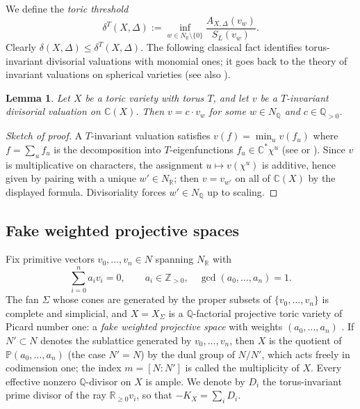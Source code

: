 \documentclass[11pt]{amsart}
\newtheorem{lemma}[theorem]{Lemma}
\theoremstyle{definition}
\theoremstyle{remark}
\newcommand{\NR}{N_{\mathbb{R}}}
\newcommand{\Q}{\mathbb{Q}}
\newcommand{\R}{\mathbb{R}}
\newcommand{\Z}{\mathbb{Z}}
\newcommand{\C}{\mathbb{C}}
\newcommand{\PP}{\mathbb{P}}
\begin{document}
We define the \emph{toric threshold}
\[
\delta^T(X,\Delta) := \inf_{w\in\NR\setminus\{0\}}
\frac{A_{X,\Delta}(v_w)}{S_L(v_w)} .
\]
Clearly \(\delta(X,\Delta)\le\delta^T(X,\Delta)\). The following classical
fact identifies torus-invariant divisorial valuations with monomial ones;
it goes back to the theory of invariant valuations on spherical varieties
\cite{Kno93} (see also \cite[\S7]{BJ20}).

\begin{lemma}\label{lem:invariant}
Let \(X\) be a toric variety with torus \(T\), and let \(v\) be a
\(T\)-invariant divisorial valuation on \(\C(X)\). Then \(v=c\cdot v_w\)
for some \(w\in N_{\Q}\) and \(c\in\Q_{>0}\).
\end{lemma}

\begin{proof}[Sketch of proof]
A \(T\)-invariant valuation satisfies
\(v(f)=\min_u v(f_u)\) where \(f=\sum_u f_u\) is the decomposition into
\(T\)-eigenfunctions \(f_u\in\C^*\chi^u\) (see \cite{Kno93} or
\cite[\S19-20]{Tim11}). Since \(v\) is multiplicative on characters, the
assignment \(u\mapsto v(\chi^u)\) is additive, hence given by pairing with
a unique \(w'\in\NR\); then \(v=v_{w'}\) on all of \(\C(X)\) by the
displayed formula. Divisoriality forces \(w'\in N_\Q\) up to scaling.
\end{proof}

\subsection{Fake weighted projective spaces}\label{ss:fwps}
Fix primitive vectors \(v_0,\dots,v_n\in N\) spanning \(\NR\) with
\begin{equation}\label{eq:relation}
\sum_{i=0}^n a_i v_i = 0, \qquad a_i\in\Z_{>0},\quad
\gcd(a_0,\dots,a_n)=1 .
\end{equation}
The fan \(\Sigma\) whose cones are generated by the proper subsets of
\(\{v_0,\dots,v_n\}\) is complete and simplicial, and
\(X=X_\Sigma\) is a \(\Q\)-factorial projective toric variety of Picard
number one: a \emph{fake weighted projective space} with weights
\((a_0,\dots,a_n)\) \cite{Buc08,Kas09}. If \(N'\subset N\) denotes the
sublattice generated by \(v_0,\dots,v_n\), then \(X\) is the quotient of
\(\PP(a_0,\dots,a_n)\) (the case \(N'=N\)) by the dual group of \(N/N'\),
which acts freely in codimension one; the index \(m=[N:N']\) is called
the multiplicity of \(X\). Every effective nonzero \(\Q\)-divisor on
\(X\) is ample. We denote by \(D_i\) the torus-invariant prime divisor of
the ray \(\R_{\ge0} v_i\), so that \(-K_X=\sum_i D_i\).
\end{document}
